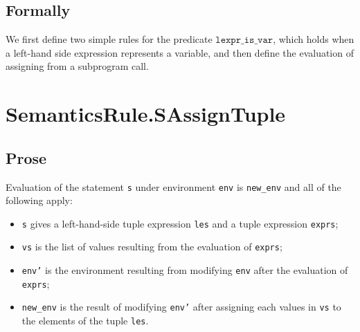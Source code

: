 \documentclass{book}
\newcommand\tododefine[1]{\texttt{#1}}
\newcommand\ordered[3]{{#1}\xrightarrow{#2}{#3}}
\newcommand\evalarrow[0]{\rightsquigarrow}
\newcommand\sslash[0]{\mathbin{/\mkern-6mu/}}
\newcommand\terminateas[0]{\;\sslash\;}
\newcommand\ExprThrowsConfig[0]{\texttt{\#T}}
\newcommand\ErrorConfig[0]{\texttt{\#E}}
\newcommand\OrAbnormal[0]{\terminateas \ExprThrowsConfig, \ErrorConfig}
\newcommand\evalstmt[1]{\texttt{eval\_stmt}(#1)}
\newcommand\evalcall[1]{\texttt{eval\_call}(#1)}
\newcommand\evalmultiassignment[1]{\texttt{multi\_assign}(#1)}
\newcommand\Normal[0]{\textsf{Normal}}
\newcommand\Continuing[0]{\textsf{Continuing}}
\newcommand\newenv[0]{\texttt{new\_env}}
\newcommand\env[0]{\texttt{env}}
\newcommand\envp[0]{\texttt{env'}}
\newcommand\vg[0]{\texttt{g}}
\newcommand\vvs[0]{\texttt{vs}}
\newcommand\vle[0]{\texttt{le}}
\newcommand\vles[0]{\texttt{les}}
\newcommand\vgone[0]{\texttt{g1}}
\newcommand\vgtwo[0]{\texttt{g2}}
\newcommand\name[0]{\texttt{name}}
\newcommand\args[0]{\texttt{args}}
\newcommand\namedargs[0]{\texttt{named\_args}}
\newcommand\les[0]{\texttt{les}}
\begin{document}
\begin{emptyformal}
  \subsection{Formally}
\newcommand\lexprisvar[0]{\texttt{lexpr\_is\_var}}

We first define two simple rules for the predicate $\lexprisvar$, which holds when a left-hand side expression
represents a variable, and then define the evaluation of assigning from a subprogram call.
\end{emptyformal}


\section{SemanticsRule.SAssignTuple \label{sec:SemanticsRule.SAssignTuple}}

    \subsection{Prose}
  Evaluation of the statement \texttt{s} under environment \texttt{env} is
\texttt{new\_env} and all of the following apply:
  \begin{itemize}
  \item \texttt{s} gives a left-hand-side tuple expression \texttt{les} and a tuple expression \texttt{exprs};
  \item \texttt{vs} is the list of values resulting from the evaluation of \texttt{exprs};
  \item \texttt{env'} is the environment resulting from modifying \texttt{env} after the evaluation of \texttt{exprs};
  \item \texttt{new\_env} is the result of modifying \texttt{env'} after assigning each values in \texttt{vs} to the elements of the tuple \texttt{les}.
  \end{itemize}
\end{document}
